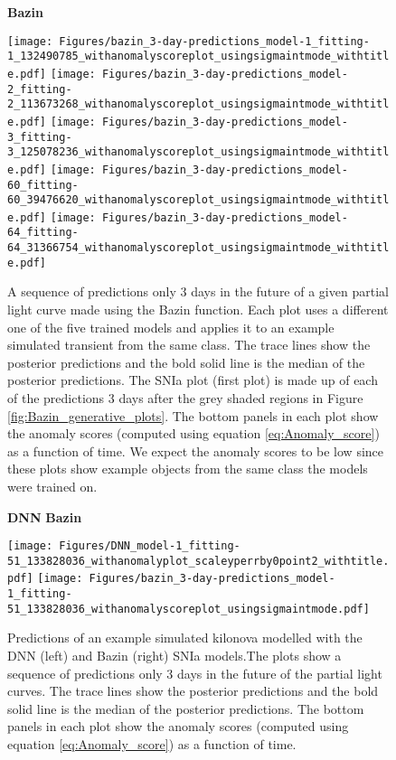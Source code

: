 \documentclass[fleqn,usenatbib]{mnras}
\begin{document}
\begin{figure*}
    \centering
    \textbf{Bazin}\par\medskip
    \vspace{-0.5em}
        {\texttt{[image: Figures/bazin\_3-day-predictions\_model-1\_fitting-1\_132490785\_withanomalyscoreplot\_usingsigmaintmode\_withtitle.pdf]}}
        {\texttt{[image: Figures/bazin\_3-day-predictions\_model-2\_fitting-2\_113673268\_withanomalyscoreplot\_usingsigmaintmode\_withtitle.pdf]}}
        {\texttt{[image: Figures/bazin\_3-day-predictions\_model-3\_fitting-3\_125078236\_withanomalyscoreplot\_usingsigmaintmode\_withtitle.pdf]}}
        {\texttt{[image: Figures/bazin\_3-day-predictions\_model-60\_fitting-60\_39476620\_withanomalyscoreplot\_usingsigmaintmode\_withtitle.pdf]}}
        {\texttt{[image: Figures/bazin\_3-day-predictions\_model-64\_fitting-64\_31366754\_withanomalyscoreplot\_usingsigmaintmode\_withtitle.pdf]}}
    \caption{A sequence of predictions only 3 days in the future of a given partial light curve made using the Bazin function. Each plot uses a different one of the five trained models and applies it to an example simulated transient from the same class. The trace lines show the posterior predictions and the bold solid line is the median of the posterior predictions. The SNIa plot (first plot) is made up of each of the predictions 3 days after the grey shaded regions in Figure \ref{fig:Bazin_generative_plots}. The bottom panels in each plot show the anomaly scores (computed using equation \ref{eq:Anomaly_score}) as a function of time. We expect the anomaly scores to be low since these plots show example objects from the same class the models were trained on.}
    \label{fig:Bazin_predictive_plots}
\end{figure*}

	
  \begin{figure*}
    \begin{flushleft}
        \hspace{0.33\linewidth} \textbf{DNN} \hspace{0.31\linewidth} \textbf{Bazin}\par\medskip
        \vspace{-1.5em}
    \end{flushleft}
	\centering
	\texttt{[image: Figures/DNN\_model-1\_fitting-51\_133828036\_withanomalyplot\_scaleyperrby0point2\_withtitle.pdf]}
	\texttt{[image: Figures/bazin\_3-day-predictions\_model-1\_fitting-51\_133828036\_withanomalyscoreplot\_usingsigmaintmode.pdf]}
	\caption{Predictions of an example simulated kilonova modelled with the DNN (left) and Bazin (right) SNIa models.The plots show a sequence of predictions only 3 days in the future of the partial light curves. The trace lines show the posterior predictions and the bold solid line is the median of the posterior predictions. The bottom panels in each plot show the anomaly scores (computed using equation \ref{eq:Anomaly_score}) as a function of time.}
	\label{fig:anomaly_example}
  \end{figure*}  
\end{document}
